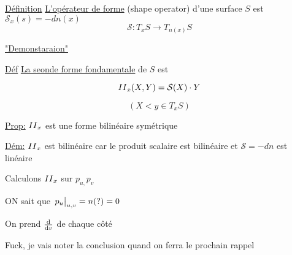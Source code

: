 \underline{Définition} \underline{L'opérateur de forme} (shape operator) d'une surface $S$ est $\mathcal{S}_x(s) = - dn(x)$   
$$\mathcal{S} : T_{x} S \to T_{n(x)} S$$ 

\underline{"Demonstaraion"} 


\underline{Déf} \underline{La seonde forme fondamentale}  de $S$ est 

\newcommand{\rom}[1]
    {\MakeUppercase{\romannumeral #1}}


$$\rom 2_x (X, Y) = \mathcal{S}(X)\cdot Y$$ 

$$(X< y \in T_{x} S)$$ 


\underline{Prop:} $\rom 2_x$ est une forme bilinéaire symétrique

\underline{Dém:} $\rom2_x$ est bilinéaire car le produit scalaire est bilinéaire et $\mathcal{S} = - dn$ est linéaire

Calculons $\rom 2_x$ sur $p_{u,} p_{v} $

ON sait que $\eval{p_u}_{u,v} = n(?) = 0 $ 

On prend $\dv{v}$ de chaque côté

Fuck, je vais noter la conclusion quand on ferra le prochain rappel	



